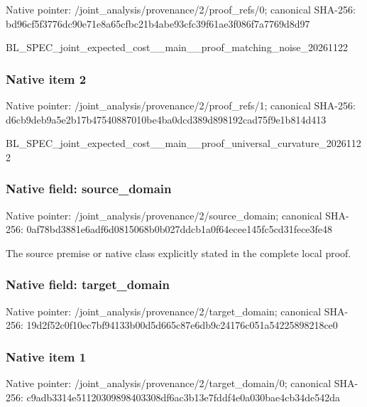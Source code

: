 \documentclass[10pt,a4paper]{article}
\begin{document}
Native pointer: /joint\_analysis/provenan\allowbreak{}ce/2/proof\_refs/0; canonical SHA-256: bd96cf5f3776dc90e71e8a65\allowbreak{}cfbc21b4abe93cfc39f61ae3\allowbreak{}f086f7a7769d8d97


BL\_SPEC\_joint\_expected\_c\allowbreak{}ost\_\_main\_\_proof\_matchin\allowbreak{}g\_noise\_20261122


\subsubsection{Native item 2}


Native pointer: /joint\_analysis/provenan\allowbreak{}ce/2/proof\_refs/1; canonical SHA-256: d6cb9deb9a5e2b17b4754088\allowbreak{}7010be4ba0dcd389d898192c\allowbreak{}ad75f9e1b814d413


BL\_SPEC\_joint\_expected\_c\allowbreak{}ost\_\_main\_\_proof\_univers\allowbreak{}al\_curvature\_20261122


\subsubsection{Native field: source\_domain}


Native pointer: /joint\_analysis/provenan\allowbreak{}ce/2/source\_domain; canonical SHA-256: 0af78bd3881e6adf6d081506\allowbreak{}8b0b027ddcb1a0f64ecee145\allowbreak{}fc5cd31fece3fe48


The source premise or native class explicitly stated in the complete local proof.


\subsubsection{Native field: target\_domain}


Native pointer: /joint\_analysis/provenan\allowbreak{}ce/2/target\_domain; canonical SHA-256: 19d2f52c0f10ec7bf94133b0\allowbreak{}0d5d665c87e6db9c24176c05\allowbreak{}1a54225898218ce0



\subsubsection{Native item 1}


Native pointer: /joint\_analysis/provenan\allowbreak{}ce/2/target\_domain/0; canonical SHA-256: c9adb3314e51120309898403\allowbreak{}308df6ac3b13e7fddf4e0a03\allowbreak{}0bae4cb34de542da
\end{document}
